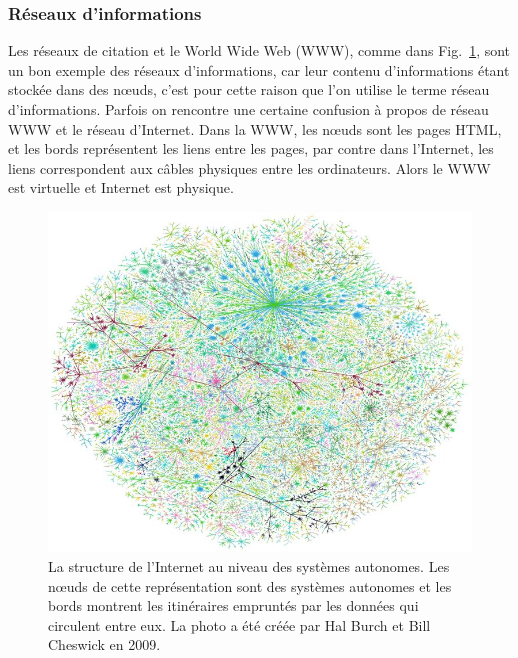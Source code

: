 \subsubsection{Réseaux d'informations}        
Les  réseaux de citation et le World Wide Web (WWW), comme dans Fig.~\ref{WWW}, sont un bon exemple des réseaux
d'informations, car leur contenu d'informations étant stockée dans des nœuds, c’est pour cette raison que l’on 
utilise le terme réseau d’informations. Parfois on rencontre une certaine confusion à propos de réseau  WWW 
et le réseau d'Internet. Dans la WWW, les nœuds sont les pages HTML, et les bords représentent les liens entre 
les pages, par contre  dans l'Internet, les liens correspondent aux câbles physiques entre les ordinateurs. Alors  
le WWW est virtuelle et Internet est physique.
\begin{figure}[h!]
	\centering
	\includegraphics[scale=0.4]{./figures/www2}
	\caption{La structure de l'Internet au niveau des systèmes autonomes. Les nœuds de cette représentation sont des systèmes autonomes et les bords montrent les itinéraires empruntés par les données qui circulent entre eux. La photo a été créée par Hal Burch et Bill Cheswick en 2009.}
	\label{WWW}
\end{figure}

